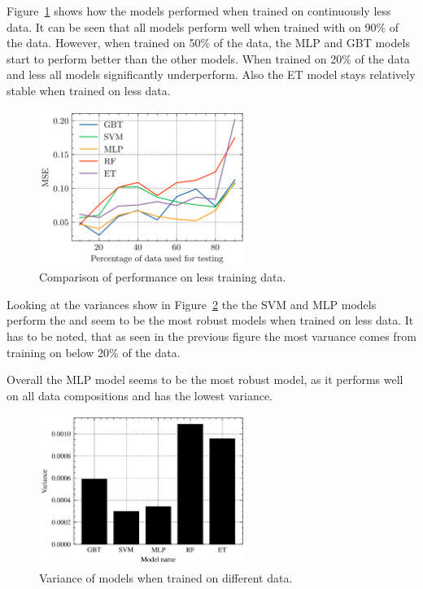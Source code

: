 Figure~\ref{fig:results-missing-values} shows how the models performed when trained on
continuously less data.
It can be seen that all models perform well when trained with on 90\% of the data.
However, when trained on 50\% of the data, the \ac{MLP}  and \ac{GBT} models start to perform
better than the
other models.
When trained on 20\% of the data and less all models significantly underperform.
Also the \ac{ET} model stays relatively stable when trained on less data.

\begin{figure}[H]
    \begin{tcolorbox}[arc=0pt,boxrule=0.5pt]
        \centering
        \includegraphics[width=0.6\textwidth]{chap5/images/missing_values_plot}
    \end{tcolorbox}
    \caption{Comparison of performance on less training data.}
    \label{fig:results-missing-values}
\end{figure}

Looking at the variances show in Figure~\ref{fig:variance-missing-values} the the \ac{SVM} and \ac{MLP} models
perform the and seem to be the most robust models when trained on less data.
It has to be noted, that as seen in the previous figure the most varuance comes from training on
below 20\% of the data.

Overall the \ac{MLP} model seems to be the most robust model, as it performs well on all data
compositions and has the lowest variance.

\begin{figure}[h]
    \begin{tcolorbox}[arc=0pt,boxrule=0.5pt]
        \centering
        \includegraphics[width=0.6\textwidth]{chap5/images/variance_missing_values}
    \end{tcolorbox}
    \caption{Variance of models when trained on different data.}
    \label{fig:variance-missing-values}
\end{figure}

